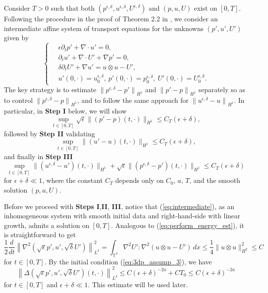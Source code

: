 \documentclass[reqno,10pt]{amsart}
\theoremstyle{definition}
\theoremstyle{remark}
\numberwithin{equation}{section}
\begin{document}
Consider $T>0$ such that both $(p^{\epsilon,\delta},u^{\epsilon,\delta},U^{\epsilon,\delta})$ and $(p,u,U)$ exist on $[0,T]$. Following the procedure in the proof of Theorem 2.2 in \cite{HRYZ25}, we consider an intermediate affine  system of transport equations for the unknowns $(p',u',U')$ given by 
\begin{equation} \label{eq:intermediate}
\left \{ \
\begin{aligned}
  &\epsilon \partial_t p' + \nabla \cdot u' =0, \\
  &\partial_t u' + \nabla \cdot U' + \nabla p' = 0, \\
  &\delta \partial_t U' + \nabla u' = u\otimes u - U', \\
  &u'(0,\cdot)=u^{\epsilon,\delta}_0, \ p'(0,\cdot)=p^{\epsilon,\delta}_0, \ U'(0,\cdot)=U^{\epsilon,\delta}_0.
\end{aligned}
\right.
\end{equation}
The key strategy is to estimate ${\|p^{\epsilon,\delta}-p'\|}_{H^1}$ and ${\|p'-p\|}_{H^1}$ separately so as to control ${\|p^{\epsilon,\delta}-p\|}_{H^1}$, and to follow the same approach for ${\|u^{\epsilon,\delta}-u\|}_{H^1}$.
In particular, in \textbf{Step I} below, we will show
\begin{equation} \label{eq:pprime_p_h1}
    \sup_{t\in[0,T]}  \sqrt\epsilon\|(p'-p)(t,\cdot)\|_{H^1}\le C_T(\epsilon+\delta),
\end{equation}
followed by \textbf{Step II} validating 
\begin{equation} \label{eq:uprime_u_h1}
    \sup_{t\in[0,T]} \|(u'-u)(t,\cdot)\|_{H^1}\le C_T(\epsilon+\delta),
\end{equation}
and finally in \textbf{Step III}
\begin{equation} \label{eq:relax_interm}
    \sup_{t\in[0,T]} \|(u^{\epsilon,\delta}-u')(t,\cdot)\|_{H^1} +  \sqrt\epsilon\|(p^{\epsilon,\delta}-p')(t,\cdot)\|_{H^1}\le C_T(\epsilon+\delta)
\end{equation}
for $\epsilon+\delta\ll 1$, where the constant $C_T$ depends only on $C_0$, $a$, $T$, and the smooth solution $(p,u,U)$.

Before we proceed with \textbf{Steps I},{\bf II}, {\bf III}, notice that (\ref{eq:intermediate}), as an inhomogeneous system with smooth initial data and right-hand-side with linear growth, admits a solution on $[0,T]$. Analogous to (\ref{eq:perform_energy_est}), it is straightforward to get
\[
    \frac{1}{2}\frac{d}{dt} \left\|\nabla^2 \left( \sqrt\epsilon p', u', \sqrt\delta U' \right) \right\|_{L^2}^2
    = \int_{\mathbb T^3} \nabla^2U':\nabla^2(u\otimes u-U') \, dx
    \le \frac{1}{4} \|u\otimes u\|_{H^2}^2 \le C
\]
for $t\in [0,T]$. By the initial condition (\ref{eq:3dp_assump_3}), we have
\begin{equation} \label{eq:uprime_h2}
    \left\|\Delta \left( \sqrt\epsilon p', u', \sqrt\delta U' \right)(t,\cdot) \right\|_{L^2}^2 \le C(\epsilon+\delta)^{-2a} + CT_0 \le C(\epsilon+\delta)^{-2a}
\end{equation}
for $t\in [0,T]$ and $\epsilon+\delta\ll 1$. This estimate will be used later.
\end{document}
